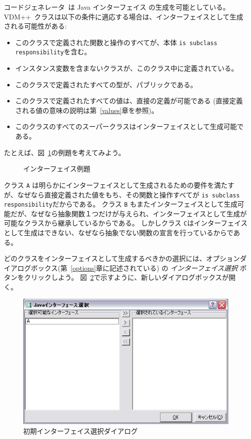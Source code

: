 \documentclass[\pformat,11pt]{jarticle}
\newcommand{\Tcg}{コードジェネレータ}
\newcommand{\VDM}{VDM++}
\begin{document}
\Tcg\ は Java インターフェイス \cite{Gosling&00}の生成を可能としている。
 \VDM\ クラスは以下の条件に適応する場合は、インターフェイスとして生成される可能性がある:
\begin{itemize}
\item このクラスで定義された関数と操作のすべてが、本体 \texttt{is subclass responsibility}を含む。
\item インスタンス変数を含まないクラスが、このクラス中に定義されている。
\item このクラスで定義されたすべての型が、パブリックである。
\item このクラスで定義されたすべての値は、直接の定義が可能である (直接定義される値の意味の説明は第~\ref{values}章を参照)。
\item このクラスのすべてのスーパークラスはインターフェイスとして生成可能である。
\end{itemize}
たとえば、図~\ref{fig:interfacesex}の例題を考えてみよう。
\begin{figure}
\begin{quote}

\end{quote}
\caption{インターフェイス例題}\label{fig:interfacesex}
\end{figure}
クラス \texttt{A} は明らかにインターフェイスとして生成されるための要件を満たすが、なぜなら直接定義された値をもち、その関数と操作すべてが \texttt{is subclass responsibility}だからである。
クラス \texttt{B} もまたインターフェイスとして生成可能だが、なぜなら抽象関数１つだけが与えられ、インターフェイスとして生成が可能なクラスから継承しているからである。
しかしクラス \texttt{C}はインターフェイスとして生成はできない、なぜなら抽象でない関数の宣言を行っているからである。

どのクラスをインターフェイスとして生成するべきかの選択には、オプションダイアログボックス(第~\ref{options}章に記述されている) の \textit{インターフェイス選択} ボタンをクリックしよう。
 図~\ref{fig:interfaces1}で示すように、新しいダイアログボックスが開く。

\begin{figure}
\begin{center}
\includegraphics[width=.8\textwidth]{interfaces1}
\end{center}
\caption{初期インターフェイス選択ダイアログ}\label{fig:interfaces1}
\end{figure}
\end{document}
